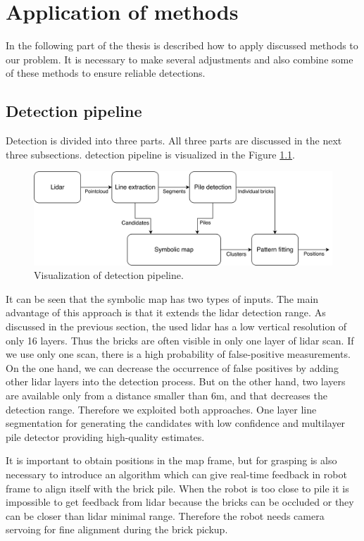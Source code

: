 \chapter{Application of methods}
\label{ch:applications}
In the following part of the thesis is described how to apply discussed methods to our problem. It is necessary to make several adjustments and also combine some of these methods to ensure reliable detections.

\section{Detection pipeline}
Detection is divided into three parts. All three parts are discussed in the next three subsections. detection pipeline is visualized in the Figure \ref{fig:flowchart}. 

\hspace{5px}
\begin{figure}[H]
\centering
\includegraphics[scale=0.06]{fig/flowchart.pdf}
\caption[Program pipeline]{Visualization of detection pipeline.}
\label{fig:flowchart}
\end{figure}

It can be seen that the symbolic map has two types of inputs. The main advantage of this approach is that it extends the lidar detection range. As discussed in the previous section, the used lidar has a low vertical resolution of only 16 layers. Thus the bricks are often visible in only one layer of lidar scan. If we use only one scan, there is a high probability of false-positive measurements. On the one hand, we can decrease the occurrence of false positives by adding other lidar layers into the detection process. But on the other hand, two layers are available only from a distance smaller than $6$m, and that decreases the detection range. Therefore we exploited both approaches. One layer line segmentation for generating the candidates with low confidence and multilayer pile detector providing high-quality estimates. 

It is important to obtain positions in the map frame, but for grasping is also necessary to introduce an algorithm which can give real-time feedback in robot frame to align itself with the brick pile. When the robot is too close to pile it is impossible to get feedback from lidar because the bricks can be occluded or they can be closer than lidar minimal range. Therefore the robot needs camera servoing for fine alignment during the brick pickup.


